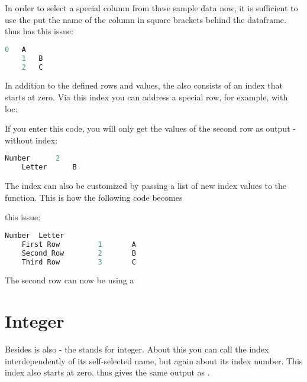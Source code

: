 In order to select a special column from these sample data now, it is sufficient to use the
put the name of the column in square brackets behind the dataframe. 
thus has this issue:

\medskip

\begin{lstlisting}[language=Python]
	0	A
	1	B
	2	C
\end{lstlisting}

\medskip

In addition to the defined rows and values, the  also consists of an index that starts at zero. Via this index you can address a special row, for example, with loc:

If you enter this code, you will only get the values of the second row as output - without index:

\medskip

\begin{lstlisting}[language=Python]
	Number	    2
	Letter  	B
\end{lstlisting}

\medskip


The index can also be customized by passing a list of new index values to the
 function. This is how the following code becomes

this issue:

\medskip

\begin{lstlisting}[language=Python]
	Number  Letter
	First Row	      1       A
	Second Row        2       B
	Third Row         3       C
\end{lstlisting}

\medskip

The second row can now be  using a 






\section{Integer}

Besides  is also  - the  stands for integer. About this you can call the index interdependently of its self-selected name, but again about its index number. This index also starts at zero.  thus gives the same output as .

